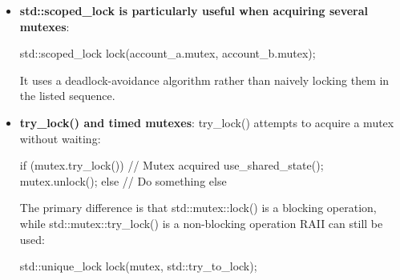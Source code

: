\documentclass{report}
\begin{document}
\begin{itemize}
\begin{cppcode}
                modify_shared_state();

                lock.unlock();
                perform_expensive_work();

                lock.lock();
                modify_shared_state_again();
            \end{cppcode}
            \bigbreak \noindent 
            It supports:
            \begin{itemize}
                \item Deferred locking
                \item Manual unlock/relock
                \item Ownership transfer
                \item Condition variables
                \item Timed mutex operations
            \end{itemize}
            It has slightly more state and overhead than std::lock\_guard.
        \item \textbf{std::scoped\_lock is particularly useful when acquiring several mutexes}: 
            \bigbreak \noindent 
            \begin{cppcode}
            std::scoped_lock lock(account_a.mutex, account_b.mutex);
            \end{cppcode}
            \bigbreak \noindent 
            It uses a deadlock-avoidance algorithm rather than naively locking them in the listed sequence.
        \item \textbf{try\_lock() and timed mutexes}: try\_lock() attempts to acquire a mutex without waiting:
            \bigbreak \noindent 
            \begin{cppcode}
                if (mutex.try_lock()) {
                    // Mutex acquired
                    use_shared_state();
                    mutex.unlock();
                } else {
                    // Do something else
                }
            \end{cppcode}
            \bigbreak \noindent 
            The primary difference is that std::mutex::lock() is a blocking operation, while std::mutex::try\_lock() is a non-blocking operation
            \bigbreak \noindent 
            RAII can still be used:
            \bigbreak \noindent 
            \begin{cppcode}
                std::unique_lock lock(mutex, std::try_to_lock);


\end{cppcode}
\end{itemize}
\end{document}
